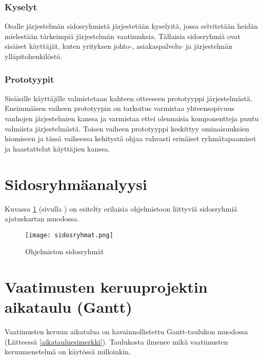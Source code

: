         \subsubsection{Kyselyt}

        Osalle järjestelmän sidosryhmistä järjestetään kyselyitä, jossa selvitetään heidän mielestään tärkeimpiä järjestelmän vaatimuksia.
        Tällaisia sidosryhmiä ovat sisäiset käyttäjät, kuten yrityksen johto-, asiakaspalvelu- ja järjestelmän ylläpitohenkilöstö.

        \subsubsection*{Prototyypit}

        Sisäisille käyttäjille valmistetaan kahteen otteeseen prototyyppi järjestelmästä. Ensimmäisen vaiheen prototyypin on tarkoitus varmistaa yhteensopivuus vanhojen järjestelmien kanssa ja varmistaa ettei olennaisia komponentteja puutu valmiista järjestelmästä. Toisen vaiheen prototyyppi keskittyy ominaisuuksien hiomiseen ja tässä vaiheessa kehitystä ohjaa vahvasti erinäiset ryhmätapaamiset ja haastattelut käyttäjien kanssa.
	
\section{Sidosryhmäanalyysi}

        Kuvassa \ref{img:sidosryhmat} (sivulla \pageref{img:sidosryhmat}) on esitelty erilaisia ohjelmistoon liittyviä sidosryhmiä ajatuskartan muodossa.

        \begin{figure}[H] %
		\centering
		\texttt{[image: sidosryhmat.png]}
		\caption{Ohjelmiston sidosryhmät} %
		\label{img:sidosryhmat}
	\end{figure}
	
\section{Vaatimusten keruuprojektin aikataulu (Gantt)}

	Vaatimusten keruun aikatulua on havainnollistettu Gantt-taulukon muodossa (Liitteessä \ref{aikatauluesimerkki}). Taulukosta ilmenee mikä vaatimusten keruumenetelmä on käytössä milloinkin.

